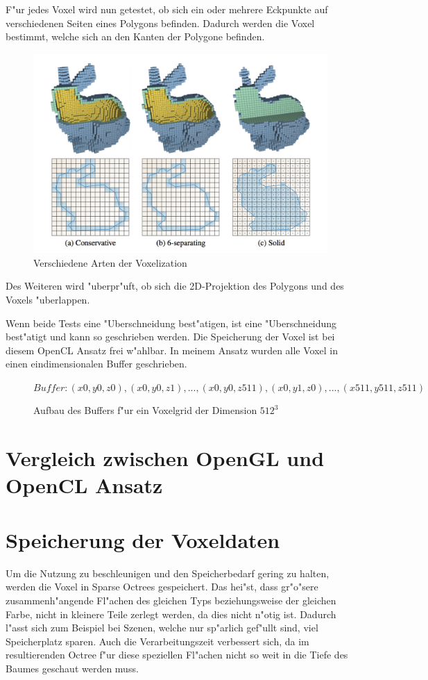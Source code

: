 \documentclass[a4paper, 12pt]{scrartcl}
\begin{document}
F"ur jedes Voxel wird nun getestet, ob sich ein oder mehrere Eckpunkte auf verschiedenen Seiten eines Polygons befinden. Dadurch werden die Voxel bestimmt, welche sich an den Kanten der Polygone befinden. 

\begin{figure}
	\centering
		\includegraphics[width=16cm]{Kinds-of-Voxelization}
	\caption{Verschiedene Arten der Voxelization}
\end{figure}

Des Weiteren wird "uberpr"uft, ob sich die 2D-Projektion des Polygons und des Voxels "uberlappen. 

Wenn beide Tests eine "Uberschneidung best"atigen, ist eine "Uberschneidung best"atigt und kann so geschrieben werden.
Die Speicherung der Voxel ist bei diesem OpenCL Ansatz frei w"ahlbar. 
In meinem Ansatz wurden alle Voxel in einen eindimensionalen Buffer geschrieben. 

\begin{figure}
		$Buffer: (x0, y0, z0), (x0, y0, z1), ..., (x0, y0, z511), (x0, y1, z0), ..., (x511, y511, z511)$
\caption{Aufbau des Buffers f"ur ein Voxelgrid der Dimension $512^3$}

\end{figure}

\section{Vergleich zwischen OpenGL und OpenCL Ansatz}

\section{Speicherung der Voxeldaten}
Um die Nutzung zu beschleunigen und den Speicherbedarf gering zu halten, werden die Voxel in Sparse Octrees gespeichert. 
Das hei"st, dass gr"o"sere zusammenh"angende Fl"achen des gleichen Typs beziehungsweise der gleichen Farbe, nicht in kleinere Teile zerlegt werden, da dies nicht n"otig ist.
Dadurch l"asst sich zum Beispiel bei Szenen, welche nur sp"arlich gef"ullt sind, viel Speicherplatz sparen. 
Auch die Verarbeitungszeit verbessert sich, da im resultierenden Octree f"ur diese speziellen Fl"achen nicht so weit in die Tiefe des Baumes geschaut werden muss.
\end{document}
